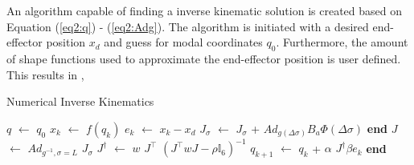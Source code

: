 An algorithm capable of finding a inverse kinematic solution is created based on Equation (\ref{eq2:q}) - (\ref{eq2:Adg}). The algorithm is initiated with a desired end-effector position $x_d$ and guess for modal coordinates $q_0$. Furthermore, the amount of shape functions used to approximate the end-effector position is user defined. This results in
,


\begin{algorithm}[H]
\caption{Numerical Inverse Kinematics}
\begin{algorithmic}[1]
\State $q$ $\leftarrow$ $q_0$ 
      
    \State $x_k$ $\leftarrow$ $f(q_k)$  
     \State $e_k$ $\leftarrow$ $x_k - x_d$ 
            \State $J_{\sigma}$ $\leftarrow$  $J_{\sigma}$ + $Ad_{g(\Delta \sigma)} B_a \Phi(\Delta \sigma)$ 
        \EndFor
    \State \textbf{end}
    \State $J$ $\leftarrow$ $Ad_{g^{-1},\sigma=L}$ $J_{\sigma}$ 
    \State $J^{\dagger}$ $\leftarrow$  $w$ $J^{\top}$ $(J^\top w J - \rho \mathbb{I}_6)^{-1}$ 
    \State $q_{k+1}$  $\leftarrow$ $q_{k}$ + $\alpha$ $J^{\dagger} \beta e_k$ 
\EndWhile 
\State \textbf{end}
    \label{alg2:numericalinverse}
\end{algorithmic}
\end{algorithm}



